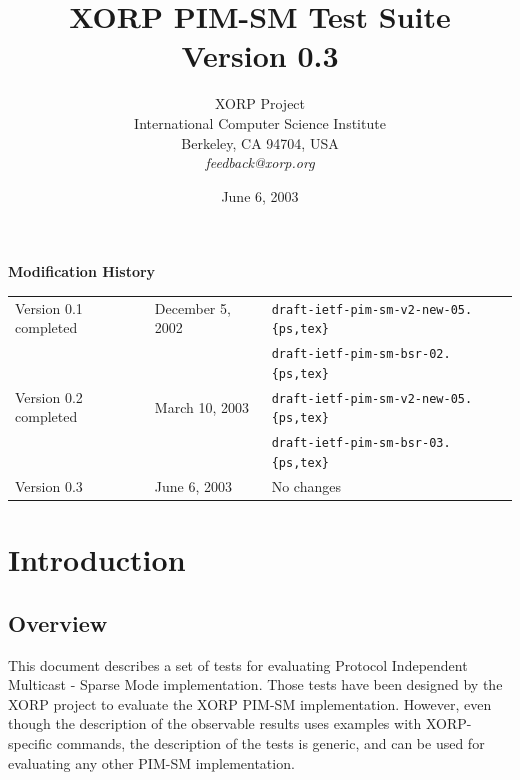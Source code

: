 \documentclass[11pt]{report}
\begin{document}
\title{XORP PIM-SM Test Suite \\
\vspace{1ex}
Version 0.3}
\author{ XORP Project                                   \\
         International Computer Science Institute       \\
         Berkeley, CA 94704, USA                        \\
         {\it feedback@xorp.org}
}
\date{June 6, 2003}

\maketitle

\thispagestyle{empty}


\newpage
\thispagestyle{empty}
{\huge \bf Modification History}
\vspace{4ex}

\begin{tabular}{lll}
Version 0.1 completed	& December 5, 2002 & \verb=draft-ietf-pim-sm-v2-new-05.{ps,tex}= \\
			&		   & \verb=draft-ietf-pim-sm-bsr-02.{ps,tex}= \\
Version 0.2 completed	& March 10, 2003 & \verb=draft-ietf-pim-sm-v2-new-05.{ps,tex}= \\
			&		   & \verb=draft-ietf-pim-sm-bsr-03.{ps,tex}= \\
Version 0.3		& June 6, 2003	   & No changes

\end{tabular}

\tableofcontents
\listoftables
\listoffigures

\setcounter{chapter}{-1}
\chapter{Introduction}

\section{Overview}

This document describes a set of tests for evaluating Protocol Independent
Multicast - Sparse Mode implementation. Those tests have been designed
by the XORP project to evaluate the XORP PIM-SM implementation.
However, even though the description of the observable results uses
examples with XORP-specific commands, the description of the tests is generic,
and can be used for evaluating any other PIM-SM implementation.
\end{document}
